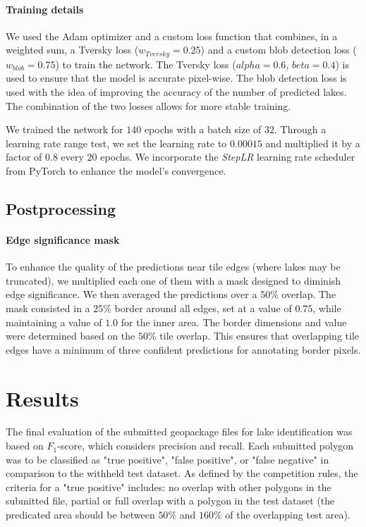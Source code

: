 \documentclass[sigconf]{acmart}
\begin{document}
\paragraph{Training details} We used the Adam optimizer and a custom loss function that combines, in a weighted sum, a Tversky loss ($w_{Tversky}=0.25$) and a custom blob detection loss ($w_{blob}=0.75$) to train the network. The Tversky loss ($alpha=0.6$, $beta=0.4$) is used to ensure that the model is accurate pixel-wise. The blob detection loss is used with the idea of improving the accuracy of the number of predicted lakes. The combination of the two losses allows for more stable training.

We trained the network for $140$ epochs with a batch size of $32$. Through a learning rate range test, we set the learning rate to $0.00015$ and multiplied it by a factor of $0.8$ every $20$ epochs. We incorporate the \textit{StepLR} learning rate scheduler from PyTorch to enhance the model's convergence.

\subsection{Postprocessing}

\paragraph{Edge significance mask}
To enhance the quality of the predictions near tile edges (where lakes may be truncated), we multiplied each one of them with a mask designed to diminish edge significance. We then averaged the predictions over a $50\%$ overlap.
The mask consisted in a $25\%$ border around all edges, set at a value of $0.75$, while maintaining a value of $1.0$ for the inner area.
The border dimensions and value were determined based on the $50\%$ tile overlap. This ensures that overlapping tile edges have a minimum of three confident predictions for annotating border pixels.

\section{Results}

The final evaluation of the submitted geopackage files for lake identification was based on $F_1$-score, which considers precision and recall. Each submitted polygon was to be classified as "true positive", "false positive", or "false negative" in comparison to the withheld test dataset.
As defined by the competition rules, the criteria for a "true positive" includes: no overlap with other polygons in the submitted file, partial or full overlap with a polygon in the test dataset (the predicated area should be between $50\%$ and $160\%$ of the overlapping test area).
\end{document}
